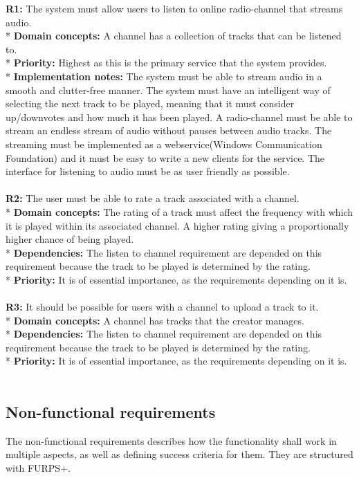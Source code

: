 \documentclass[a4paper,11pt,report]{article}
\begin{document}
\textbf{R1:}
The system must allow users to listen to online radio-channel that streams audio. \\*
\textbf{Domain concepts:}
A channel has a collection of tracks that can be listened to. \\*
\textbf{Priority:}
Highest as this is the primary service that the system provides. \\*
\textbf{Implementation notes:}
The system must be able to stream audio in a smooth and clutter-free manner. The system must have an intelligent way of selecting the next track to be played, meaning that it must consider up/downvotes and how much it has been played.
A radio-channel must be able to stream an endless stream of audio without pauses between audio tracks.
The streaming must be implemented as a webservice(Windows Communication Foundation) and it must be
easy to write a new clients for the service.
The interface for listening to audio must be as user friendly as possible.
\\ \\

\textbf{R2:}
The user must be able to rate a track associated with a channel. \\*
\textbf{Domain concepts:}
The rating of a track must affect the frequency with which it is played within its associated channel.
A higher rating giving a proportionally higher chance of being played. \\*
\textbf{Dependencies:}
The listen to channel requirement are depended on this requirement because the track to be played is determined by the rating.\\*
\textbf{Priority:}
It is of essential importance, as the requirements depending on it is.
\\ \\

\textbf{R3:}
It should be possible for users with a channel to upload a track to it. \\*
\textbf{Domain concepts:}
A channel has tracks that the creator manages. \\*
\textbf{Dependencies:}
The listen to channel requirement are depended on this requirement because the track to be played is determined by the rating.\\*
\textbf{Priority:}
It is of essential importance, as the requirements depending on it is.
 \\ \\

\subsection{Non-functional requirements}
The non-functional requirements describes how the functionality shall work in multiple aspects, as well as defining success criteria for them. They are structured with FURPS+. \\
\end{document}
